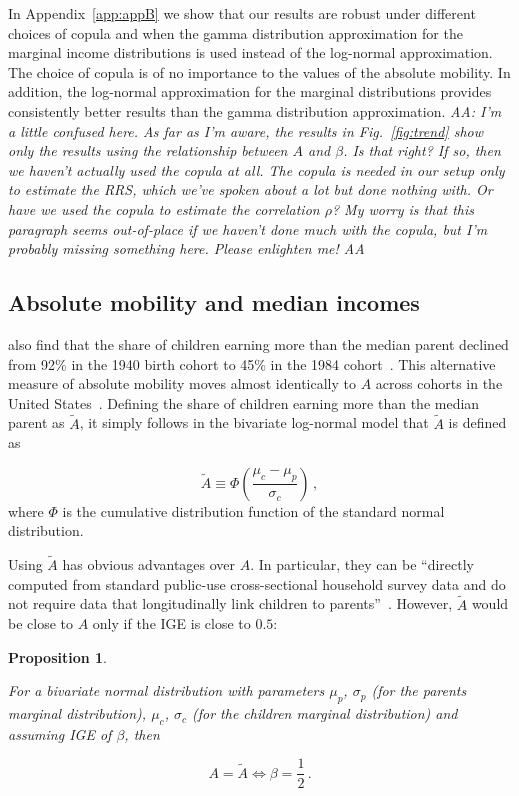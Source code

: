 \documentclass[12pt,a4paper]{article}
\newtheorem{proposition}{Proposition}
\newcommand{\red}[1]{{\color{red} #1}}
\newcommand{\elabel}[1]{\label{eq:#1}}
\newcommand{\AAA}[1]{\red{{\it AA: #1 AA}}}
\newcommand{\fref}[1]{Fig.~\ref{fig:#1}}
\newcommand{\be}{\begin{equation}}
\newcommand{\ee}{\end{equation}}
\numberwithin{equation}{section}
\begin{document}
In Appendix~\ref{app:appB} we show that our results are robust under different choices of copula and when the gamma distribution approximation for the marginal income distributions is used instead of the log-normal approximation. The choice of copula is of no importance to the values of the absolute mobility. In addition, the log-normal approximation for the marginal distributions provides consistently better results than the gamma distribution approximation. \AAA{I'm a little confused here. As far as I'm aware, the results in \fref{trend} show only the results using the relationship between $A$ and $\beta$. Is that right? If so, then we haven't actually used the copula at all. The copula is needed in our setup only to estimate the RRS, which we've spoken about a lot but done nothing with. Or have we used the copula to estimate the correlation $\rho$? My worry is that this paragraph seems out-of-place if we haven't done much with the copula, but I'm probably missing something here. Please enlighten me!}

\subsection{Absolute mobility and median incomes}

\citet{chetty2017fading} also find that the share of children earning more than the median parent declined from 92\% in the 1940 birth cohort to 45\% in the 1984 cohort~\citep{katz2017documenting}. This alternative measure of absolute mobility moves almost identically to $A$ across cohorts in the United States~\citep{katz2017documenting}. Defining the share of children earning more than the median parent as $\tilde{A}$, it simply follows in the bivariate log-normal model that $\tilde{A}$ is defined as

\be
\tilde{A} \equiv \Phi\left(\frac{\mu_c-\mu_p}{\sigma_c} \right)\,,
\elabel{tildeA}
\ee
where $\Phi$ is the cumulative distribution function of the standard normal distribution.

Using $\tilde{A}$ has obvious advantages over $A$. In particular, they can be ``directly computed from standard public-use cross-sectional household survey data and do not require data that longitudinally link children to parents''~\citep[p.~382]{katz2017documenting}. However, $\tilde{A}$ would be close to $A$ only if the IGE is close to $0.5$:

\begin{proposition}
\label{prop:prop3}

For a bivariate normal distribution with parameters $\mu_p$, $\sigma_p$ (for the parents marginal distribution), $\mu_c$, $\sigma_c$ (for the children marginal distribution) and assuming IGE of $\beta$, then

\be
A=\tilde{A} \iff \beta=\frac{1}{2}\,.
\ee
\end{proposition}
\end{document}
